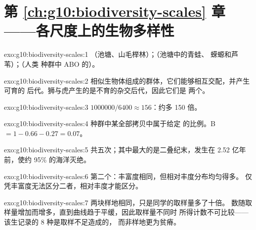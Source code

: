 \section*{第 \ref{ch:g10:biodiversity-scales} 章——各尺度上的生物多样性}

\begin{solution}{exo:g10:biodiversity-scales:1}
（池塘、山毛榉林）；（池塘中的青蛙、
蝾螈和芦苇）；（人类
种群中 ABO 的）。
\end{solution}

\begin{solution}{exo:g10:biodiversity-scales:2}
相似生物体组成的群体，它们能够相互交配，并产生可育的
后代。狮与虎产生的是不育的杂交后代，因此它们是
两个。
\end{solution}

\begin{solution}{exo:g10:biodiversity-scales:3}
$\num{1000000}/6400 \approx 156$：约多 150 倍。
\end{solution}

\begin{solution}{exo:g10:biodiversity-scales:4}
种群中某全部拷贝中属于给定
的比例。B $= 1 - 0.66 - 0.27 = 0.07$。
\end{solution}

\begin{solution}{exo:g10:biodiversity-scales:5}
共五次；其中最大的是二叠纪末，发生在
2.52 亿年前，使约 95\% 的海洋灭绝。
\end{solution}

\begin{solution}{exo:g10:biodiversity-scales:6}
第二个：丰富度相同，但相对丰度分布均匀得多。
仅凭丰富度无法区分二者，相对丰度才能区分。
\end{solution}

\begin{solution}{exo:g10:biodiversity-scales:7}
两块样地相同，只是同学的取样量多了十倍。
数随取样量增加而增多，直到曲线趋于平缓，因此取样量不同时
所得计数不可比较——该生记录的 8 种是取样不足造成的，
而非样地更为贫瘠。
\end{solution}

